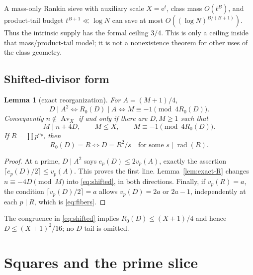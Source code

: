 \documentclass[10pt,reqno]{amsart}
\newtheorem{lemma}[theorem]{Lemma}
\theoremstyle{definition}
\newcommand{\Av}{\operatorname {Av}}
\newcommand{\rad}{\operatorname {rad}}
\newcommand{\e}{\mathrm e}
\newcommand{\1}{\mathbf 1}
\begin{document}
A mass-only Rankin sieve with auxiliary scale $X=\e^t$, class mass $O(t^B)$, and product-tail budget $t^{B+1}\ll\log N$ can save at most $O((\log N)^{B/(B+1)})$.  Thus the intrinsic supply has the formal ceiling $3/4$.  This is only a ceiling inside that mass/product-tail model; it is not a nonexistence theorem for other uses of the class geometry.

\subsection{Shifted-divisor form}
\begin{lemma}[exact reorganization]\label{lem:shifted}
For $A=(M+1)/4$,
\[
 D\mid A^2\Longleftrightarrow R_0(D)\mid A
 \Longleftrightarrow M\equiv-1\pmod{4R_0(D)}.
\]
Consequently $n\notin\Av_X$ if and only if there are $D,M\geq1$ such that
\begin{equation}\label{eq:shifted}
 M\mid n+4D,\qquad M\leq X,\qquad
 M\equiv-1\pmod{4R_0(D)}.
\end{equation}
If $R=\prod p^{a_p}$, then
\begin{equation}\label{eq:fibers}
 R_0(D)=R\Longleftrightarrow D=R^2/s
 \quad\text{for some }s\mid\rad(R).
\end{equation}
\end{lemma}
\begin{proof}
At a prime, $D\mid A^2$ says $e_p(D)\leq2v_p(A)$, exactly the assertion $\lceil e_p(D)/2\rceil\leq v_p(A)$.  This proves the first line.  Lemma~\ref{lem:exact-R} changes $n\equiv-4D\pmod M$ into \eqref{eq:shifted}, in both directions.  Finally, if $v_p(R)=a$, the condition $\lceil v_p(D)/2\rceil=a$ allows $v_p(D)=2a$ or $2a-1$, independently at each $p\mid R$, which is \eqref{eq:fibers}.
\end{proof}
The congruence in \eqref{eq:shifted} implies $R_0(D)\leq(X+1)/4$ and hence $D\leq(X+1)^2/16$; no $D$-tail is omitted.

\section{Squares and the prime slice}\label{sec:prime}
\end{document}
